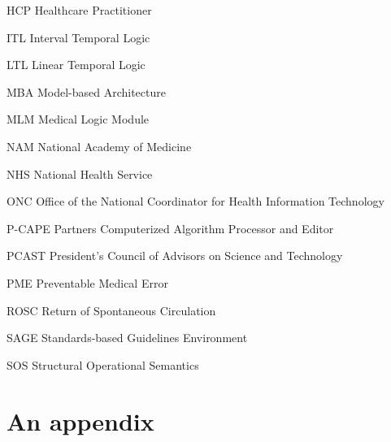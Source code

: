 \documentclass{uiucthesis2021}
\newcounter{counterforappendices}
\begin{document}
\begin{abbrevlist}
\item[HCP]      Healthcare Practitioner
\item[ITL]      Interval Temporal Logic
\item[LTL]      Linear Temporal Logic
\item[MBA]      Model-based Architecture
\item[MLM]      Medical Logic Module
\item[NAM]      National Academy of Medicine
\item[NHS]      National Health Service
\item[ONC]      Office of the National Coordinator for Health Information Technology
\item[P-CAPE]   Partners Computerized Algorithm Processor and Editor
\item[PCAST]    President's Council of Advisors on Science and Technology
\item[PME]      Preventable Medical Error
\item[ROSC]     Return of Spontaneous Circulation
\item[SAGE]     Standards-based Guidelines Environment
\item[SOS]      Structural Operational Semantics
\end{abbrevlist}

%

\mainmatter














\backmatter

\printbibliography[heading=bibintoc,title={References}]

\clearpage
\setcounter{counterforappendices}{\value{page}}
\mainmatter
\setcounter{page}{\value{counterforappendices}}

\appendix

\chapter{An appendix}


% 
\end{document}
